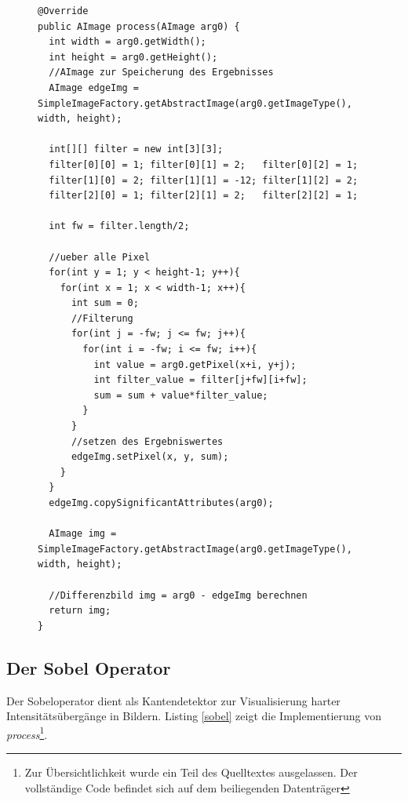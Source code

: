 \begin{figure}[htbp]
\begin{lstlisting}[frame=leftline]
@Override
public AImage process(AImage arg0) {
  int width = arg0.getWidth();
  int height = arg0.getHeight();
  //AImage zur Speicherung des Ergebnisses	
  AImage edgeImg = SimpleImageFactory.getAbstractImage(arg0.getImageType(), width, height);

  int[][] filter = new int[3][3];
  filter[0][0] = 1; filter[0][1] = 2;   filter[0][2] = 1; 
  filter[1][0] = 2; filter[1][1] = -12; filter[1][2] = 2;
  filter[2][0] = 1; filter[2][1] = 2;   filter[2][2] = 1;

  int fw = filter.length/2;
  
  //ueber alle Pixel		
  for(int y = 1; y < height-1; y++){
    for(int x = 1; x < width-1; x++){
      int sum = 0;
      //Filterung
      for(int j = -fw; j <= fw; j++){
        for(int i = -fw; i <= fw; i++){
          int value = arg0.getPixel(x+i, y+j);
          int filter_value = filter[j+fw][i+fw];
          sum = sum + value*filter_value;
        }
      }
      //setzen des Ergebniswertes
      edgeImg.setPixel(x, y, sum);
    }
  }
  edgeImg.copySignificantAttributes(arg0);
		
  AImage img = SimpleImageFactory.getAbstractImage(arg0.getImageType(), width, height);
		
  //Differenzbild img = arg0 - edgeImg berechnen
  return img;
}
\end{lstlisting}
\end{figure}
 
\FloatBarrier
\subsection{Der Sobel Operator}

Der Sobeloperator dient als Kantendetektor zur Visualisierung harter Intensitätsübergänge in Bildern. Listing \ref{sobel} zeigt die Implementierung von \textit{process}\footnote{Zur Übersichtlichkeit wurde ein Teil des Quelltextes ausgelassen. Der vollständige Code befindet sich auf dem beiliegenden Datenträger}.

